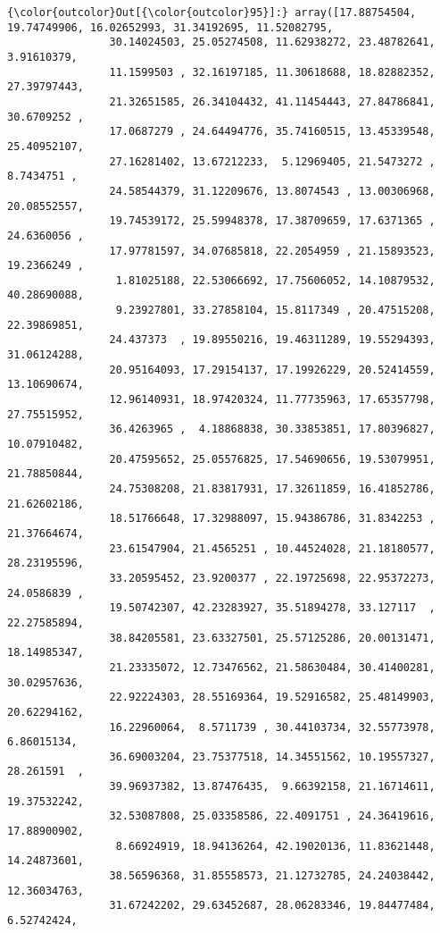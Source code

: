 \documentclass[11pt]{article}
\begin{document}
\begin{Verbatim}[commandchars=\\\{\}]
{\color{outcolor}Out[{\color{outcolor}95}]:} array([17.88754504, 19.74749906, 16.02652993, 31.34192695, 11.52082795,
                30.14024503, 25.05274508, 11.62938272, 23.48782641,  3.91610379,
                11.1599503 , 32.16197185, 11.30618688, 18.82882352, 27.39797443,
                21.32651585, 26.34104432, 41.11454443, 27.84786841, 30.6709252 ,
                17.0687279 , 24.64494776, 35.74160515, 13.45339548, 25.40952107,
                27.16281402, 13.67212233,  5.12969405, 21.5473272 ,  8.7434751 ,
                24.58544379, 31.12209676, 13.8074543 , 13.00306968, 20.08552557,
                19.74539172, 25.59948378, 17.38709659, 17.6371365 , 24.6360056 ,
                17.97781597, 34.07685818, 22.2054959 , 21.15893523, 19.2366249 ,
                 1.81025188, 22.53066692, 17.75606052, 14.10879532, 40.28690088,
                 9.23927801, 33.27858104, 15.8117349 , 20.47515208, 22.39869851,
                24.437373  , 19.89550216, 19.46311289, 19.55294393, 31.06124288,
                20.95164093, 17.29154137, 17.19926229, 20.52414559, 13.10690674,
                12.96140931, 18.97420324, 11.77735963, 17.65357798, 27.75515952,
                36.4263965 ,  4.18868838, 30.33853851, 17.80396827, 10.07910482,
                20.47595652, 25.05576825, 17.54690656, 19.53079951, 21.78850844,
                24.75308208, 21.83817931, 17.32611859, 16.41852786, 21.62602186,
                18.51766648, 17.32988097, 15.94386786, 31.8342253 , 21.37664674,
                23.61547904, 21.4565251 , 10.44524028, 21.18180577, 28.23195596,
                33.20595452, 23.9200377 , 22.19725698, 22.95372273, 24.0586839 ,
                19.50742307, 42.23283927, 35.51894278, 33.127117  , 22.27585894,
                38.84205581, 23.63327501, 25.57125286, 20.00131471, 18.14985347,
                21.23335072, 12.73476562, 21.58630484, 30.41400281, 30.02957636,
                22.92224303, 28.55169364, 19.52916582, 25.48149903, 20.62294162,
                16.22960064,  8.5711739 , 30.44103734, 32.55773978,  6.86015134,
                36.69003204, 23.75377518, 14.34551562, 10.19557327, 28.261591  ,
                39.96937382, 13.87476435,  9.66392158, 21.16714611, 19.37532242,
                32.53087808, 25.03358586, 22.4091751 , 24.36419616, 17.88900902,
                 8.66924919, 18.94136264, 42.19020136, 11.83621448, 14.24873601,
                38.56596368, 31.85558573, 21.12732785, 24.24038442, 12.36034763,
                31.67242202, 29.63452687, 28.06283346, 19.84477484,  6.52742424,

\end{Verbatim}
\end{document}
